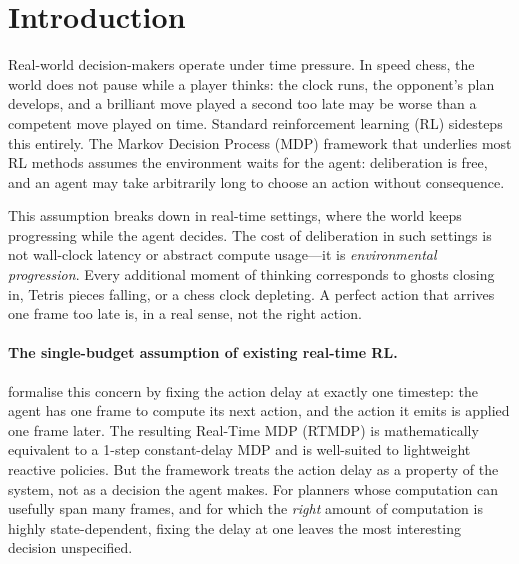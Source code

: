 %

\section{Introduction}

Real-world decision-makers operate under time pressure.
In speed chess, the world does not pause while a player thinks: the clock
runs, the opponent's plan develops, and a brilliant move played a second too
late may be worse than a competent move played on time.
Standard reinforcement learning (RL) sidesteps this entirely.
The Markov Decision Process (MDP) framework that underlies most RL methods
assumes the environment waits for the agent: deliberation is free, and an
agent may take arbitrarily long to choose an action without consequence.

This assumption breaks down in real-time settings, where the world keeps
progressing while the agent decides.
The cost of deliberation in such settings is not wall-clock latency or
abstract compute usage---it is \emph{environmental progression}.
Every additional moment of thinking corresponds to ghosts closing in,
Tetris pieces falling, or a chess clock depleting.
A perfect action that arrives one frame too late is, in a real sense,
not the right action.

\paragraph{The single-budget assumption of existing real-time RL.}
\citet{ramstedt2019rtrl} formalise this concern by fixing the action delay
at exactly one timestep: the agent has one frame to compute its next action,
and the action it emits is applied one frame later.
The resulting Real-Time MDP (RTMDP) is mathematically equivalent to a
1-step constant-delay MDP \citep{walsh2009delayed} and is well-suited to
lightweight reactive policies.
But the framework treats the action delay as a property of the system,
not as a decision the agent makes.
For planners whose computation can usefully span many frames, and for which
the \emph{right} amount of computation is highly state-dependent, fixing
the delay at one leaves the most interesting decision unspecified.

